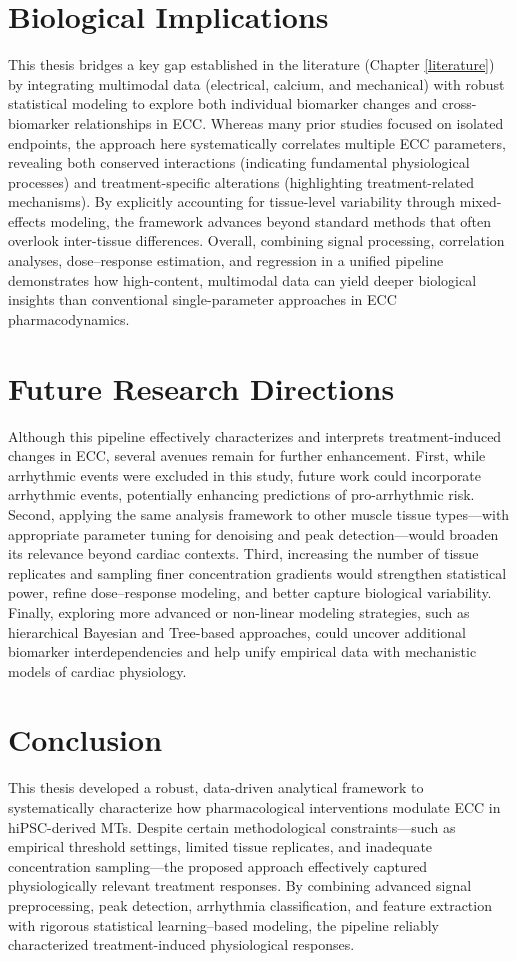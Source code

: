\documentclass{report}
\begin{document}
    \section{Biological Implications}
    This thesis bridges a key gap established in the literature (Chapter \ref{literature}) by integrating multimodal data (electrical, calcium, and mechanical) with robust statistical modeling to explore both individual biomarker changes and cross-biomarker relationships in ECC. Whereas many prior studies focused on isolated endpoints, the approach here systematically correlates multiple ECC parameters, revealing both conserved interactions (indicating fundamental physiological processes) and treatment-specific alterations (highlighting treatment-related mechanisms). By explicitly accounting for tissue-level variability through mixed-effects modeling, the framework advances beyond standard methods that often overlook inter-tissue differences. Overall, combining signal processing, correlation analyses, dose–response estimation, and regression in a unified pipeline demonstrates how high-content, multimodal data can yield deeper biological insights than conventional single-parameter approaches in ECC pharmacodynamics.
    
    \section{Future Research Directions}
    Although this pipeline effectively characterizes and interprets treatment-induced changes in ECC, several avenues remain for further enhancement. First, while arrhythmic events were excluded in this study, future work could incorporate arrhythmic events, potentially enhancing predictions of pro-arrhythmic risk. Second, applying the same analysis framework to other muscle tissue types—with appropriate parameter tuning for denoising and peak detection—would broaden its relevance beyond cardiac contexts. Third, increasing the number of tissue replicates and sampling finer concentration gradients would strengthen statistical power, refine dose–response modeling, and better capture biological variability. Finally, exploring more advanced or non-linear modeling strategies, such as hierarchical Bayesian and Tree-based approaches, could uncover additional biomarker interdependencies and help unify empirical data with mechanistic models of cardiac physiology.
    
    \section{Conclusion}
    This thesis developed a robust, data-driven analytical framework to systematically characterize how pharmacological interventions modulate ECC in hiPSC-derived MTs. Despite certain methodological constraints—such as empirical threshold settings, limited tissue replicates, and inadequate concentration sampling—the proposed approach effectively captured physiologically relevant treatment responses. By combining advanced signal preprocessing, peak detection, arrhythmia classification, and feature extraction with rigorous statistical learning–based modeling, the pipeline reliably characterized treatment-induced physiological responses.
\end{document}
